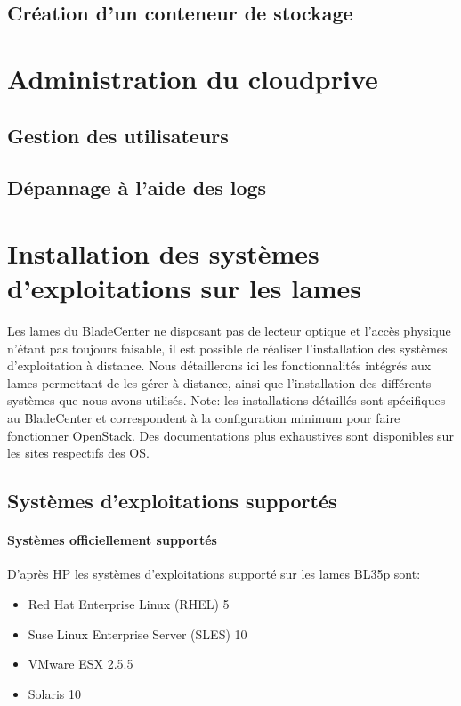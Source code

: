 \documentclass[a4paper,oneside]{report}
\begin{document}
\section{Création d'un conteneur de stockage}

\chapter{Administration du \gls{cloudprive}}

\section{Gestion des utilisateurs}

\section{Dépannage à l'aide des logs} 


\chapter{Installation des systèmes d'exploitations sur les lames} \label{sec:installos}
Les lames du BladeCenter ne disposant pas de lecteur optique et l'accès physique n'étant pas toujours faisable, il est possible de réaliser l'installation des systèmes d'exploitation à distance.
Nous détaillerons ici les fonctionnalités intégrés aux lames permettant de les gérer à distance, ainsi que l'installation des différents systèmes que nous avons utilisés.\newline
Note: les installations détaillés sont spécifiques au BladeCenter et correspondent à la configuration minimum pour faire fonctionner OpenStack. Des documentations plus exhaustives sont disponibles sur les sites respectifs des OS.

\section{Systèmes d'exploitations supportés}
\subsubsection{Systèmes officiellement supportés}
D'après HP les systèmes d'exploitations supporté sur les lames BL35p sont:
\begin{itemize}
\item Red Hat Enterprise Linux (RHEL) 5
\item Suse Linux Enterprise Server (SLES) 10
\item VMware ESX 2.5.5
\item Solaris 10
\end{itemize}
\end{document}
